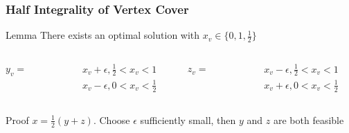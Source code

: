 \documentclass[12pt,aspectratio=169]{beamer}
\begin{document}
\begin{frame}\frametitle{Half Integrality of Vertex Cover }
 \begin{block}{Lemma}
     There exists an optimal solution with $x_{v}\in \{0, 1, \frac{1}{2}\}$
 \end{block}
\begin{columns}
  \begin{column}{0.04\textwidth}
      $y_{v} =$
  \end{column}
  \begin{column}{0.3\textwidth}
  \begin{equation}
    \begin{split}
      x_{v} +\epsilon, \frac{1}{2} < x_{v} < 1\\
      x_{v} -\epsilon, 0 < x_{v} < \frac{1}{2}
    \end{split}
  \end{equation}
\end{column}\hfill
  \begin{column}{0.04\textwidth}
      $z_{v} =$
  \end{column}
  \begin{column}{0.3\textwidth}
    \begin{equation}
    \begin{split}
      x_{v} -\epsilon, \frac{1}{2} < x_{v} < 1\\
      x_{v} +\epsilon, 0 < x_{v} < \frac{1}{2}
    \end{split}
  \end{equation}
\end{column}
\end{columns}
 \begin{block}{Proof}
   $x = \frac{1}{2}(y+z)$.
%
   Choose $\epsilon$ sufficiently small, then $y$ and $z$ are both feasible
 \end{block}
\end{frame}
\end{document}
